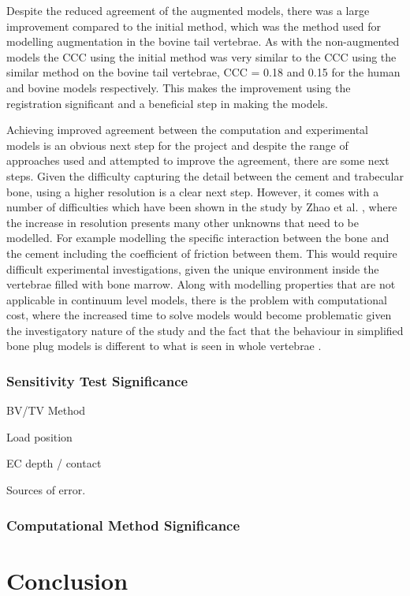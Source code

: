 Despite the reduced agreement of the augmented models, there was a large improvement compared to the initial method, which was the method used for modelling augmentation in the bovine tail vertebrae.
As with the non-augmented models the CCC using the initial method was very similar to the CCC using the similar method on the bovine tail vertebrae, CCC = 0.18 and 0.15 for the human and bovine models respectively.
This makes the improvement using the registration significant and a beneficial step in making the models.

Achieving improved agreement between the computation and experimental models is an obvious next step for the project and despite the range of approaches used and attempted to improve the agreement, there are some next steps.
Given the difficulty capturing the detail between the cement and trabecular bone, using a higher resolution is a clear next step.
However, it comes with a number of difficulties which have been shown in the study by Zhao et al. \cite{Zhao2012}, where the increase in resolution presents many other unknowns that need to be modelled.
For example modelling the specific interaction between the bone and the cement including the  coefficient of friction between them.
This would require difficult experimental investigations, given the unique environment inside the vertebrae filled with bone marrow.
Along with modelling properties that are not applicable in continuum level models, there is the problem with computational cost, where the increased time to solve models would become problematic given the investigatory nature of the study and the fact that the behaviour in simplified bone plug models is different to what is seen in whole vertebrae \cite{Sikora2013}.

\subsubsection{Sensitivity Test Significance}

BV/TV Method

Load position

EC depth / contact

Sources of error.

\subsubsection{Computational Method Significance}

\section{Conclusion}







